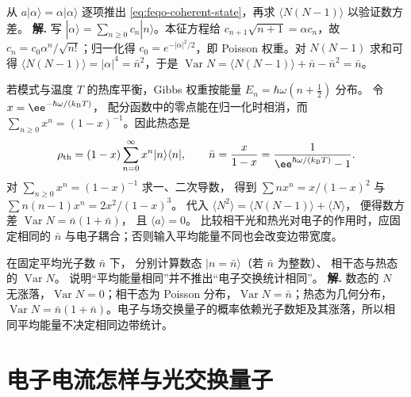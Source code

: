 \par
\begin{workedexample}
从 \(a|\alpha\rangle=\alpha|\alpha\rangle\) 逐项推出
\cref{eq:feqo-coherent-state}，再求
\(\langle N(N-1)\rangle\) 以验证数方差。
\textbf{解.} 写 \(|\alpha\rangle=\sum_{n\ge0}c_n|n\rangle\)。本征方程给 \(c_{n+1}\sqrt{n+1}=\alpha c_n\)，故 \(c_n=c_0\alpha^n/\sqrt{n!}\)；归一化得 \(c_0=e^{-|\alpha|^2/2}\)，即 Poisson 权重。对 \(N(N-1)\) 求和可得 \(\langle N(N-1)\rangle=|\alpha|^4=\bar n^2\)，于是 \(\operatorname{Var}N=\langle N(N-1)\rangle+\bar n-\bar n^2=\bar n\)。
\end{workedexample}
\par
若模式与温度 \(T\) 的热库平衡，Gibbs 权重按能量
\(E_n=\hbar\omega(n+\tfrac12)\) 分布。
令 \(x=\ee^{-\hbar\omega/(k_{\rm B}T)}\)，
配分函数中的零点能在归一化时相消，而
\(\sum_{n\ge0}x^n=(1-x)^{-1}\)。因此热态是
\begin{equation}
\rho_{\rm th}=(1-x)\sum_{n=0}^{\infty}
x^n|n\rangle\langle n|,
\qquad
\bar n=\frac{x}{1-x}
=\frac1{\ee^{\hbar\omega/(k_{\rm B}T)}-1}.
\label{eq:feqo-thermal-state}
\end{equation}
对 \(\sum_{n\ge0}x^n=(1-x)^{-1}\) 求一、二次导数，
得到 \(\sum n x^n=x/(1-x)^2\) 与
\(\sum n(n-1)x^n=2x^2/(1-x)^3\)。
代入 \(\langle N^2\rangle=\langle N(N-1)\rangle+\langle N\rangle\)，
便得数方差 \(\operatorname{Var}N=\bar n(1+\bar n)\)，
且 \(\langle a\rangle=0\)。
比较相干光和热光对电子的作用时，应固定相同的 \(\bar n\)
与电子耦合；否则输入平均能量不同也会改变边带宽度。


\par
\begin{workedexample}
在固定平均光子数 \(\bar n\) 下，
分别计算数态 \(|n=\bar n\rangle\)（若 \(\bar n\) 为整数）、
相干态与热态的 \(\operatorname{Var}N\)。
说明“平均能量相同”并不推出“电子交换统计相同”。
\textbf{解.} 数态的 \(N\) 无涨落，\(\operatorname{Var}N=0\)；相干态为 Poisson 分布，\(\operatorname{Var}N=\bar n\)；热态为几何分布，\(\operatorname{Var}N=\bar n(1+\bar n)\)。电子与场交换量子的概率依赖光子数矩及其涨落，所以相同平均能量不决定相同边带统计。
\end{workedexample}
\par
\section{电子电流怎样与光交换量子}
\label{sec:feqo-light-coupling}

